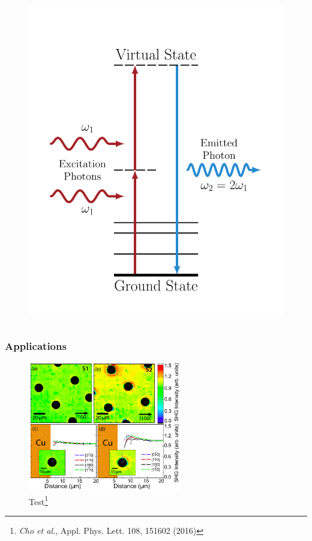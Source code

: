 \documentclass{beamer}
\begin{document}
\begin{frame}
\begin{columns}
\begin{figure}
\includegraphics[width=\textwidth]{diag-levelsshg}
\end{figure}
\end{columns}
\end{frame}

\begin{frame}
\frametitle{Applications}
\begin{figure}
\centering
\includegraphics[width=0.6\textwidth]{image-yojin}
\caption{Test\footnote{\emph{Cho et al.}, Appl. Phys. Lett. 108, 151602 (2016)}}
\end{figure}
\end{frame}
\end{document}
